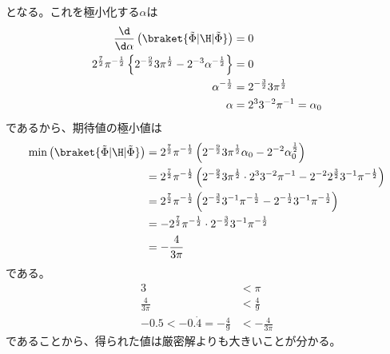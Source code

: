 となる。これを極小化する$\alpha$は
\begin{align}
	\frac{\d}{\d\alpha}\left(
		\braket{\tilde{\Phi}|\H|\tilde{\Phi}}
	\right)
&=
	0 \\
%
%
	2^{\frac{7}{2}} \pi^{-\frac{1}{2}}
		\left\{
			2^{-\frac{9}{2}} 3 \pi^{\frac{1}{2}}
			-
			2^{-3} \alpha^{-\frac{1}{2}}
		\right\}
&=
	0 \\
%
%
	\alpha^{-\frac{1}{2}}
&=
	2^{-\frac{3}{2}} 3 \pi^{\frac{1}{2}} \\
%
%
	\alpha
&=
	2^{3} 3^{-2} \pi^{-1}
=
	\alpha_0
\end{align}
であるから、期待値の極小値は
\begin{align}
	\min\left(
		\braket{\tilde{\Phi}|\H|\tilde{\Phi}}
	\right)
&=
	2^{\frac{7}{2}} \pi^{-\frac{1}{2}}
		\left(
			2^{-\frac{9}{2}} 3 \pi^{\frac{1}{2}} \alpha_0
			-
			2^{-2} \alpha_0^{\frac{1}{2}}
		\right) \\
%
%
&=
	2^{\frac{7}{2}} \pi^{-\frac{1}{2}}
		\left(
			2^{-\frac{9}{2}} 3 \pi^{\frac{1}{2}} \cdot
				2^{3} 3^{-2} \pi^{-1}
			-
			2^{-2} 2^{\frac{3}{2}} 3^{-1} \pi^{-\frac{1}{2}}
		\right) \\
%
%
&=
	2^{\frac{7}{2}} \pi^{-\frac{1}{2}}
		\left(
			2^{-\frac{3}{2}} 3^{-1} \pi^{-\frac{1}{2}}
			-
			2^{-\frac{1}{2}} 3^{-1} \pi^{-\frac{1}{2}}
		\right) \\
%
%
&=
	-
	2^{\frac{7}{2}} \pi^{-\frac{1}{2}} \cdot
		2^{-\frac{3}{2}} 3^{-1} \pi^{-\frac{1}{2}} \\
%
%
&=
	-
	\frac{4}{3\pi}
\end{align}
である。
\begin{align}
	3
&<
	\pi \\
%
%
	\frac{4}{3\pi}
&<
	\frac{4}{9} \\
%
%
	-0.5
<
	-0.\dot{4}
=
	-\frac{4}{9}
&<
	-\frac{4}{3\pi}
\end{align}
であることから、得られた値は厳密解よりも大きいことが分かる。
